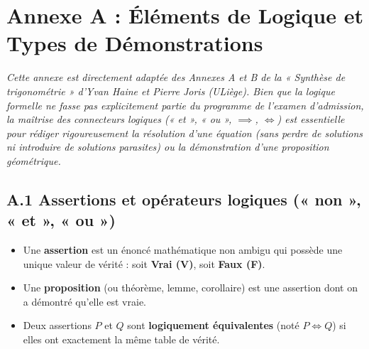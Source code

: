 \chapter*{Annexe A : Éléments de Logique et Types de Démonstrations}

\emph{Cette annexe est directement adaptée des Annexes A et B de la « Synthèse de trigonométrie » d'Yvan Haine et Pierre Joris (ULiège). Bien que la logique formelle ne fasse pas explicitement partie du programme de l'examen d'admission, la maîtrise des connecteurs logiques (« et », « ou », $\implies$, $\iff$) est essentielle pour rédiger rigoureusement la résolution d'une équation (sans perdre de solutions ni introduire de solutions parasites) ou la démonstration d'une proposition géométrique.}

\section*{A.1 Assertions et opérateurs logiques (« non », « et », « ou »)}

\begin{itemize}
    \item Une \textbf{assertion} est un énoncé mathématique non ambigu qui possède une unique valeur de vérité : soit \textbf{Vrai (V)}, soit \textbf{Faux (F)}.
    \item Une \textbf{proposition} (ou théorème, lemme, corollaire) est une assertion dont on a démontré qu'elle est vraie.
    \item Deux assertions $P$ et $Q$ sont \textbf{logiquement équivalentes} (noté $P \iff Q$) si elles ont exactement la même table de vérité.
\end{itemize}

